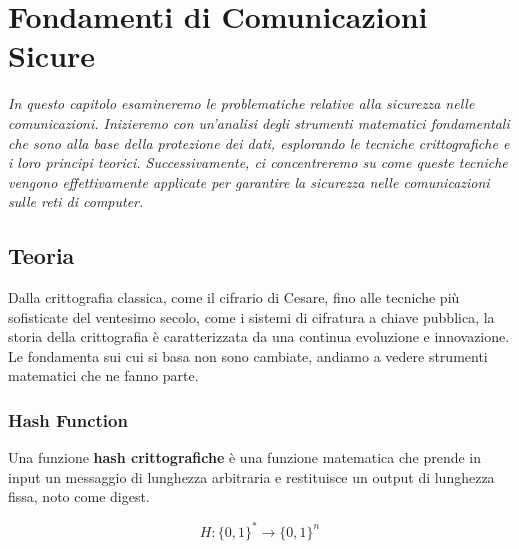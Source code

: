 \newcommand{\drawkey}[3]{
    \draw[line width=0.07cm, draw=#2] (#1) circle [radius=0.15cm];
    \draw[line width=0.07cm, draw=#2] (#1 -0.15) -- ++(0,-0.4);
    \draw[line width=0.07cm, draw=#2] (#1 -0.35) -- ++(-0.2,0);
    \draw[line width=0.07cm, draw=#2] (#1 -0.51) -- ++(-0.2,0);
    \node[below, text=#2] at (#1 -0.6) {#3}
}

\newcommand{\drawcurlybrace}[3]{%
    \draw [decorate,decoration={brace,amplitude=10pt,mirror},xshift=-4pt,yshift=0pt]
    (#1) -- (#2) node [black,midway,xshift=-2cm] {};
}

\chapter{Fondamenti di Comunicazioni Sicure}
\label{Capitolo 2} 
\textit{In questo capitolo esamineremo le problematiche relative alla
    sicurezza nelle comunicazioni. Inizieremo con un'analisi degli
    strumenti matematici fondamentali che sono alla base della protezione dei dati,
    esplorando le tecniche crittografiche e i loro principi teorici. Successivamente,
    ci concentreremo su come queste tecniche vengono effettivamente applicate per
    garantire la sicurezza nelle comunicazioni sulle reti di computer.
    }
\section{Teoria}

Dalla crittografia classica, come il cifrario di
Cesare, fino alle tecniche più sofisticate del
ventesimo secolo, come i sistemi di cifratura a chiave pubblica, la storia della
crittografia è caratterizzata da una continua evoluzione e innovazione.
Le fondamenta sui cui si basa non sono cambiate, andiamo a vedere strumenti matematici che ne fanno parte.

\subsection{Hash Function}

Una funzione \textbf{hash crittografiche} è una funzione matematica che prende in input un messaggio di lunghezza arbitraria e restituisce un output di
lunghezza fissa, noto come digest.

\begin{equation}
    H: \{0,1\}^*  \to \{0,1\}^n
\end{equation}

